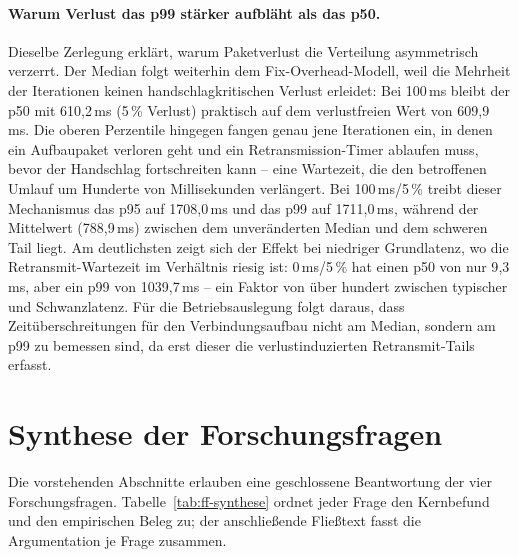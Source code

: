 \paragraph{Warum Verlust das p99 stärker aufbläht als das p50.} Dieselbe
Zerlegung erklärt, warum Paketverlust die Verteilung asymmetrisch verzerrt. Der
Median folgt weiterhin dem Fix-Overhead-Modell, weil die Mehrheit der
Iterationen keinen handschlagkritischen Verlust erleidet: Bei 100\,ms bleibt der
p50 mit 610{,}2\,ms (5\,\% Verlust) praktisch auf dem verlustfreien Wert von
609{,}9\,ms. Die oberen Perzentile hingegen fangen genau jene Iterationen ein, in
denen ein Aufbaupaket verloren geht und ein Retransmission-Timer ablaufen muss,
bevor der Handschlag fortschreiten kann -- eine Wartezeit, die den betroffenen
Umlauf um Hunderte von Millisekunden verlängert. Bei 100\,ms/5\,\% treibt dieser
Mechanismus das p95 auf 1708{,}0\,ms und das p99 auf 1711{,}0\,ms, während der
Mittelwert (788{,}9\,ms) zwischen dem unveränderten Median und dem schweren
Tail liegt. Am deutlichsten zeigt sich der Effekt bei niedriger Grundlatenz, wo
die Retransmit-Wartezeit im Verhältnis riesig ist: 0\,ms/5\,\% hat einen p50 von
nur 9{,}3\,ms, aber ein p99 von 1039{,}7\,ms -- ein Faktor von über hundert
zwischen typischer und Schwanzlatenz. Für die Betriebsauslegung folgt daraus,
dass Zeitüberschreitungen für den Verbindungsaufbau nicht am Median, sondern am
p99 zu bemessen sind, da erst dieser die verlustinduzierten Retransmit-Tails
erfasst.

\section{Synthese der Forschungsfragen}
\label{sec:eval-synthese}

Die vorstehenden Abschnitte erlauben eine geschlossene Beantwortung der vier
Forschungsfragen. Tabelle~\ref{tab:ff-synthese} ordnet jeder Frage den Kernbefund
und den empirischen Beleg zu; der anschließende Fließtext fasst die Argumentation
je Frage zusammen.

